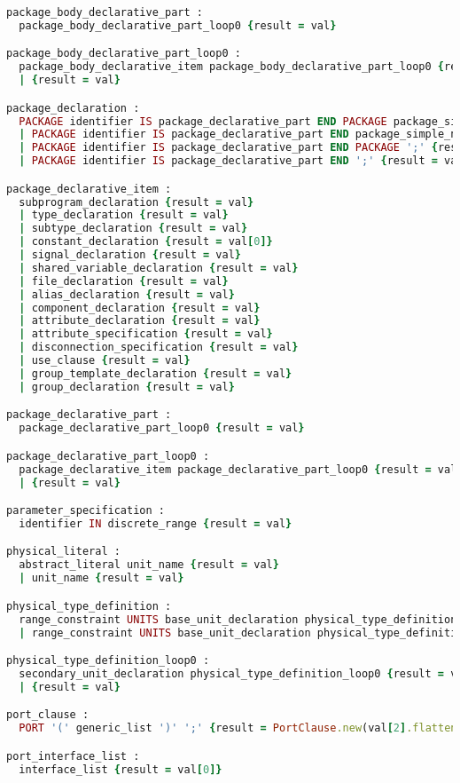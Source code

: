 \begin{lstlisting}[language=Ruby, style=rubystyle]
package_body_declarative_part :
  package_body_declarative_part_loop0 {result = val}

package_body_declarative_part_loop0 :
  package_body_declarative_item package_body_declarative_part_loop0 {result = val}
  | {result = val}

package_declaration :
  PACKAGE identifier IS package_declarative_part END PACKAGE package_simple_name ';' {result = val}
  | PACKAGE identifier IS package_declarative_part END package_simple_name ';' {result = val}
  | PACKAGE identifier IS package_declarative_part END PACKAGE ';' {result = val}
  | PACKAGE identifier IS package_declarative_part END ';' {result = val}

package_declarative_item :
  subprogram_declaration {result = val}
  | type_declaration {result = val}
  | subtype_declaration {result = val}
  | constant_declaration {result = val[0]}
  | signal_declaration {result = val}
  | shared_variable_declaration {result = val}
  | file_declaration {result = val}
  | alias_declaration {result = val}
  | component_declaration {result = val}
  | attribute_declaration {result = val}
  | attribute_specification {result = val}
  | disconnection_specification {result = val}
  | use_clause {result = val}
  | group_template_declaration {result = val}
  | group_declaration {result = val}

package_declarative_part :
  package_declarative_part_loop0 {result = val}

package_declarative_part_loop0 :
  package_declarative_item package_declarative_part_loop0 {result = val}
  | {result = val}

parameter_specification :
  identifier IN discrete_range {result = val}

physical_literal :
  abstract_literal unit_name {result = val}
  | unit_name {result = val}

physical_type_definition :
  range_constraint UNITS base_unit_declaration physical_type_definition_loop0 END UNITS physical_type_simple_name {result = val}
  | range_constraint UNITS base_unit_declaration physical_type_definition_loop0 END UNITS {result = val}

physical_type_definition_loop0 :
  secondary_unit_declaration physical_type_definition_loop0 {result = val}
  | {result = val}

port_clause :
  PORT '(' generic_list ')' ';' {result = PortClause.new(val[2].flatten);}

port_interface_list :
  interface_list {result = val[0]}


\end{lstlisting}
